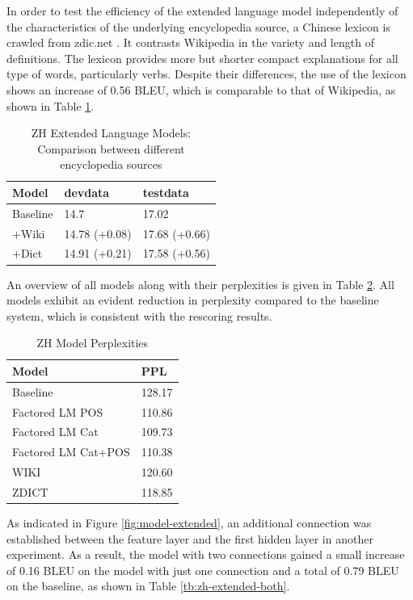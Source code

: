 \documentclass[a4paper]{article}
\begin{document}
In order to test the efficiency of the extended language model independently of the characteristics of the underlying encyclopedia  source, a Chinese lexicon is crawled from zdic.net \cite{zdic}. It contrasts Wikipedia in the variety and length of definitions. The lexicon provides more but shorter compact explanations for all type of words, particularly verbs. Despite their differences, the use of the lexicon shows an increase of 0.56 BLEU, which is comparable to that of Wikipedia, as shown in Table \ref{tb:zh-extended-diff-sources}.

\begin{table}
\caption{ZH Extended Language Models: Comparison between different encyclopedia sources}
\centering
  \begin{tabular}{lll}
  	\hline
  	Model    & devdata       & testdata      \\ \hline\hline
  	Baseline & 14.7          & 17.02         \\ \hline
  	+Wiki    & 14.78 (+0.08) & 17.68 (+0.66) \\
  	+Dict    & 14.91 (+0.21) & 17.58 (+0.56) \\ \hline
  \end{tabular}
  \label{tb:zh-extended-diff-sources}
\end{table}

An overview of all models along with their perplexities is given in Table \ref{tb:PPL}. All models exhibit an evident reduction in perplexity compared to the baseline system, which is consistent with the rescoring results.

\begin{table} 
  \caption{ZH Model Perplexities}
  \centering
  \begin{tabular}{ ll}
  	\hline
  	Model               & PPL    \\ \hline\hline
  	Baseline            & 128.17 \\ \hline
  	Factored LM POS     & 110.86 \\
  	Factored LM Cat     & 109.73 \\
  	Factored LM Cat+POS & 110.38 \\ \hline
  	WIKI                & 120.60 \\
  	ZDICT               & 118.85 \\ \hline
  \end{tabular}
  \label{tb:PPL}
\end{table}


As indicated in Figure \ref{fig:model-extended}, an additional connection was established between the feature layer and the first hidden layer in another experiment. As a result, the model with two connections gained a small increase of 0.16 BLEU on the model with just one connection and a total of 0.79 BLEU on the baseline, as shown in Table \ref{tb:zh-extended-both}.
\end{document}
